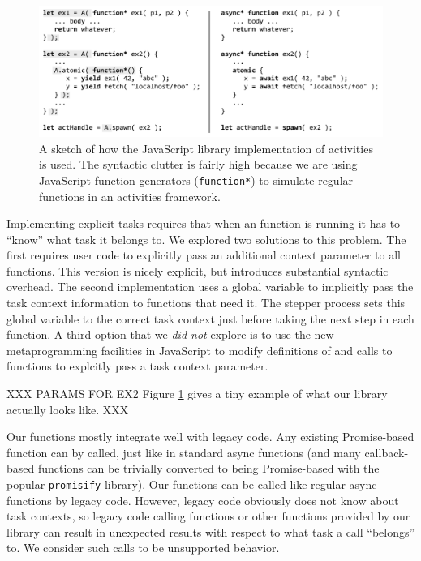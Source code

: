 \documentclass[acmsmall,anonymous,review]{acmart}\settopmatter{printfolios=true,printccs=false,printacmref=false}
\begin{document}
\begin{figure}
\includegraphics[scale=0.75]{Code/trivial_js}
\caption{A sketch of how the JavaScript library implementation of activities is used.
The syntactic clutter is fairly high because we are using JavaScript function generators (\texttt{function*}) to simulate regular functions in an activities framework.}
\label{fig:trivial_js}
\end{figure}

Implementing explicit tasks requires that when an \asyncs{} function is running it has to ``know'' what task it belongs to.
We explored two solutions to this problem.
The first requires user code to explicitly pass an additional context parameter to all \asyncs{} functions.
This version is nicely explicit, but introduces substantial syntactic overhead.
The second implementation uses a global variable to implicitly pass the task context information to functions that need it.
The stepper process sets this global variable to the correct task context just before taking the next step in each \asyncs{} function.
A third option that we \emph{did not} explore is to use the new metaprogramming facilities in JavaScript to modify definitions of and calls to \asyncs{} functions to explcitly pass a task context parameter.

XXX PARAMS FOR EX2
Figure \ref{fig:trivial_js} gives a tiny example of what our library actually looks like.
XXX

Our \asyncs{} functions mostly integrate well with legacy code.
Any existing Promise-based function can by called, just like in standard async functions (and many callback-based functions can be trivially converted to being Promise-based with the popular \texttt{promisify} library).
Our \asyncs{} functions can be called like regular async functions by legacy code.
However, legacy code obviously does not know about task contexts, so legacy code calling \asyncs{} functions or other functions provided by our library can result in unexpected results with respect to what task a call ``belongs'' to.
We consider such calls to be unsupported behavior.
\end{document}
